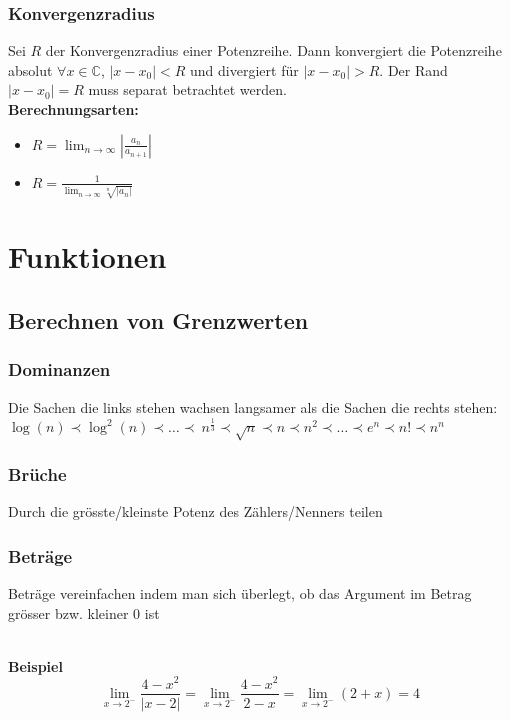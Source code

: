 \documentclass[8pt, a4paper, landscape, fleqn]{scrartcl}
\newenvironment {example}
				{\begin{itshape} \begin{small}}
				{\end{small} \end{itshape}}
\begin{document}
\begin{multicols*}{3}
				\subsubsection{Konvergenzradius}
					Sei $R$ der Konvergenzradius einer Potenzreihe. Dann konvergiert die Potenzreihe absolut $\forall x \in \mathbb{C}$, $\vert x-x_0 \vert < R$ und divergiert für $\vert x-x_0 \vert > R$. Der Rand $|x - x_0 | = R$ muss separat betrachtet werden. \\
					\textbf{Berechnungsarten: }
					\setlength{\columnseprule}{0pt}
					\begin{multicols}{2}
						\begin{itemize}
						\item $R = \lim_{n\to\infty} \left\vert \frac{a_n}{a_{n+1}}\right\vert$
					    \item $R = \frac{1}{\lim_{n\to\infty} \sqrt[n]{\vert a_n \vert}}$
						\end{itemize}
					\end{multicols}
					\setlength{\columnseprule}{0.5pt}
		\section{Funktionen}
			\subsection{Berechnen von Grenzwerten}
			    \subsubsection{Dominanzen}
			        Die Sachen die links stehen wachsen langsamer als die Sachen die rechts stehen:\\
			        $\log{(n)}\prec\log^2{(n)}\prec\dots\prec\ n^{\frac{1}{3}}\prec\sqrt{n}\prec n\prec n^2\prec\dots\prec e^n\prec n!\prec n^n$
				\subsubsection{Brüche}
					Durch die grösste/kleinste Potenz des Zählers/Nenners teilen
				\subsubsection{Beträge}
					Beträge vereinfachen indem man sich überlegt, ob das Argument im Betrag grösser bzw. kleiner 0 ist\\\\
					\begin{example}
						\textbf{Beispiel}
						\begin{equation*}
							\lim_{x \rightarrow 2^-} \frac{4-x^2}{\vert x-2 \vert} = \lim_{x \rightarrow 2^-} \frac{4-x^2}{2-x} = \lim_{x \rightarrow 2^-} (2+x) = 4
						\end{equation*}
					\end{example}

\end{multicols*}
\end{document}
